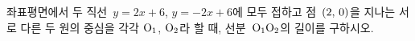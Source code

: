 좌표평면에서 두 직선~$y=2x+6$, $y=-2x+6$에 모두 접하고 점~$(2,\mkern3mu 0)$을 지나는 서로 다른 두 원의 중심을 각각 $\mathrm{O_1}$, $\mathrm{O_2}$라 할 때, 선분~$\mathrm{O_1O_2}$의 길이를 구하시오.
